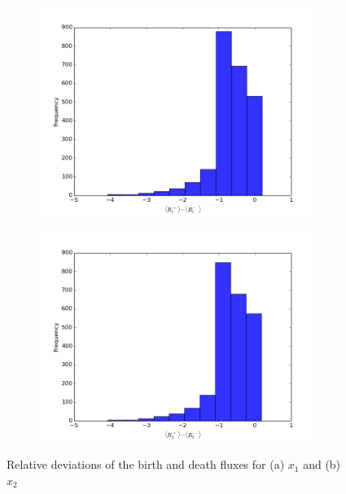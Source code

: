 \documentclass[a4paper,12pt]{article}
\begin{document}
\begin{figure}[!ht]
        \centering
        \begin{subfigure}[!ht]{0.6\textwidth}
        \centering
                \includegraphics[scale=0.5]{images/fluxes1}
                \caption{}
                \label{fig:flux_devs1}
        \end{subfigure}%
        
        \begin{subfigure}[b]{0.6\textwidth}
        \centering
                \includegraphics[scale=0.5]{images/fluxes2}
                \caption{}
                \label{fig:flux_devs2}
        \end{subfigure}
        
\caption{Relative deviations of the birth and death fluxes for (a) $x_1$ and (b) $x_2$}
\label{fig:fluxes}
\end{figure}
\end{document}
